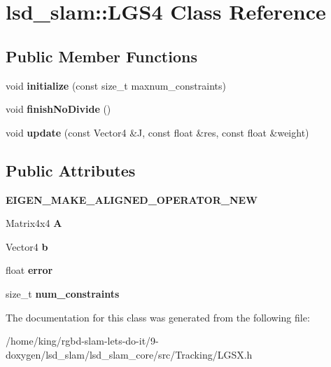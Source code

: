 \hypertarget{classlsd__slam_1_1_l_g_s4}{\section{lsd\-\_\-slam\-:\-:L\-G\-S4 Class Reference}
\label{classlsd__slam_1_1_l_g_s4}
}
\subsection*{Public Member Functions}
\begin{DoxyCompactItemize}
\item 
\hypertarget{classlsd__slam_1_1_l_g_s4_aa18a8ed78f76874149cfdc2cb04820f0}{void {\bfseries initialize} (const size\-\_\-t maxnum\-\_\-constraints)}\label{classlsd__slam_1_1_l_g_s4_aa18a8ed78f76874149cfdc2cb04820f0}

\item 
\hypertarget{classlsd__slam_1_1_l_g_s4_ab730fee0bb7add5743440ea1551b6fa8}{void {\bfseries finish\-No\-Divide} ()}\label{classlsd__slam_1_1_l_g_s4_ab730fee0bb7add5743440ea1551b6fa8}

\item 
\hypertarget{classlsd__slam_1_1_l_g_s4_adbc23aff94e3bcc39132e6f351f12187}{void {\bfseries update} (const Vector4 \&J, const float \&res, const float \&weight)}\label{classlsd__slam_1_1_l_g_s4_adbc23aff94e3bcc39132e6f351f12187}

\end{DoxyCompactItemize}
\subsection*{Public Attributes}
\begin{DoxyCompactItemize}
\item 
\hypertarget{classlsd__slam_1_1_l_g_s4_a82f7fa9153f1ebd8eff2a04944a79bbc}{{\bfseries E\-I\-G\-E\-N\-\_\-\-M\-A\-K\-E\-\_\-\-A\-L\-I\-G\-N\-E\-D\-\_\-\-O\-P\-E\-R\-A\-T\-O\-R\-\_\-\-N\-E\-W}}\label{classlsd__slam_1_1_l_g_s4_a82f7fa9153f1ebd8eff2a04944a79bbc}

\item 
\hypertarget{classlsd__slam_1_1_l_g_s4_a0d77b03bd67cc028911e06ebf4ad1ddb}{Matrix4x4 {\bfseries A}}\label{classlsd__slam_1_1_l_g_s4_a0d77b03bd67cc028911e06ebf4ad1ddb}

\item 
\hypertarget{classlsd__slam_1_1_l_g_s4_a1ea8e55e9d4d9a2abad2155d6681685d}{Vector4 {\bfseries b}}\label{classlsd__slam_1_1_l_g_s4_a1ea8e55e9d4d9a2abad2155d6681685d}

\item 
\hypertarget{classlsd__slam_1_1_l_g_s4_a0d55f3863b9517c364012b8fa10e1ffe}{float {\bfseries error}}\label{classlsd__slam_1_1_l_g_s4_a0d55f3863b9517c364012b8fa10e1ffe}

\item 
\hypertarget{classlsd__slam_1_1_l_g_s4_a7b58033ce0401ab287d40e9a0ce6f6ed}{size\-\_\-t {\bfseries num\-\_\-constraints}}\label{classlsd__slam_1_1_l_g_s4_a7b58033ce0401ab287d40e9a0ce6f6ed}

\end{DoxyCompactItemize}


The documentation for this class was generated from the following file\-:\begin{DoxyCompactItemize}
\item 
/home/king/rgbd-\/slam-\/lets-\/do-\/it/9-\/doxygen/lsd\-\_\-slam/lsd\-\_\-slam\-\_\-core/src/\-Tracking/L\-G\-S\-X.\-h\end{DoxyCompactItemize}
